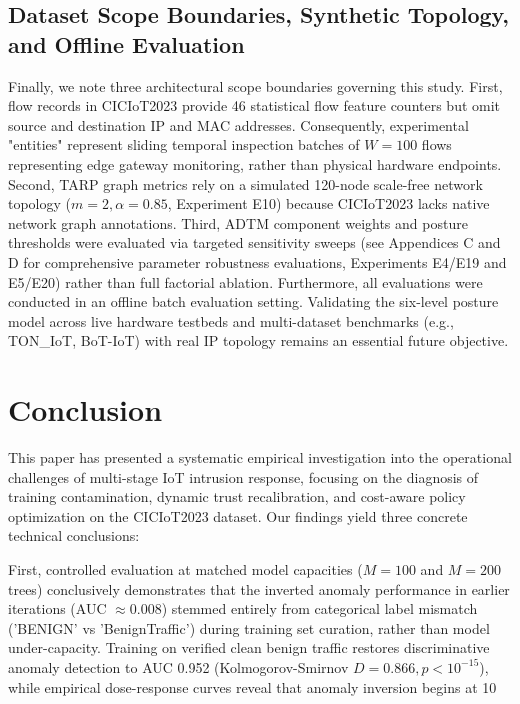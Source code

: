 \documentclass[journal,10pt,onecolumn]{IEEEtran}
\begin{document}
\subsection{Dataset Scope Boundaries, Synthetic Topology, and Offline Evaluation}
Finally, we note three architectural scope boundaries governing this study. First, flow records in CICIoT2023 provide 46 statistical flow feature counters but omit source and destination IP and MAC addresses. Consequently, experimental "entities" represent sliding temporal inspection batches of $W=100$ flows representing edge gateway monitoring, rather than physical hardware endpoints. Second, TARP graph metrics rely on a simulated 120-node scale-free network topology ($m=2, \alpha=0.85$, Experiment E10) because CICIoT2023 lacks native network graph annotations. Third, ADTM component weights and posture thresholds were evaluated via targeted sensitivity sweeps (see Appendices C and D for comprehensive parameter robustness evaluations, Experiments E4/E19 and E5/E20) rather than full factorial ablation. Furthermore, all evaluations were conducted in an offline batch evaluation setting. Validating the six-level posture model across live hardware testbeds and multi-dataset benchmarks (e.g., TON_IoT, BoT-IoT) with real IP topology remains an essential future objective.


\section{Conclusion}

This paper has presented a systematic empirical investigation into the operational challenges of multi-stage IoT intrusion response, focusing on the diagnosis of training contamination, dynamic trust recalibration, and cost-aware policy optimization on the CICIoT2023 dataset. Our findings yield three concrete technical conclusions:

First, controlled evaluation at matched model capacities ($M=100$ and $M=200$ trees) conclusively demonstrates that the inverted anomaly performance in earlier iterations (AUC $\approx 0.008$) stemmed entirely from categorical label mismatch ('BENIGN' vs 'BenignTraffic') during training set curation, rather than model under-capacity. Training on verified clean benign traffic restores discriminative anomaly detection to AUC 0.952 (Kolmogorov-Smirnov $D = 0.866, p < 10^{-15}$), while empirical dose-response curves reveal that anomaly inversion begins at 10%
\end{document}
